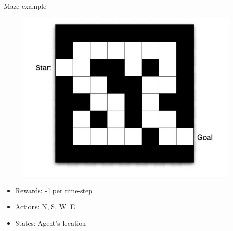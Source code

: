 \bgroup
\begin{frame}{Maze example}
\begin{minipage}{0.45\textwidth}
\begin{figure}
\centering
\includegraphics[width=\textwidth]{img/maze_setup.pdf}
\end{figure}
\end{minipage}
\begin{minipage}{0.45\textwidth}
\begin{itemize}
\item Rewards: -1 per time-step
\item Actions: N, S, W, E
\item States: Agent's location
\end{itemize}
\end{minipage}
\end{frame}
\egroup